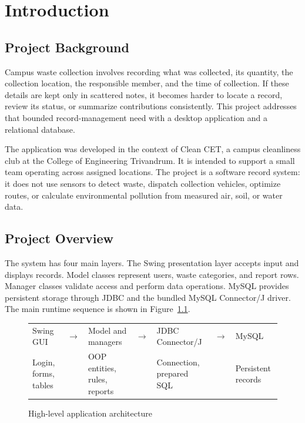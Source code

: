 \documentclass[12pt,a4paper]{report}
\begin{document}
\newpage
\tableofcontents
\listoffigures
\newpage
{}
\setcounter{page}{1}

\chapter{Introduction}
\section{Project Background}
Campus waste collection involves recording what was collected, its quantity, the collection location, the responsible member, and the time of collection. If these details are kept only in scattered notes, it becomes harder to locate a record, review its status, or summarize contributions consistently. This project addresses that bounded record-management need with a desktop application and a relational database.

The application was developed in the context of Clean CET, a campus cleanliness club at the College of Engineering Trivandrum. It is intended to support a small team operating across assigned locations. The project is a software record system: it does not use sensors to detect waste, dispatch collection vehicles, optimize routes, or calculate environmental pollution from measured air, soil, or water data.

\section{Project Overview}
The system has four main layers. The Swing presentation layer accepts input and displays records. Model classes represent users, waste categories, and report rows. Manager classes validate access and perform data operations. MySQL provides persistent storage through JDBC and the bundled MySQL Connector/J driver. The main runtime sequence is shown in Figure~\ref{fig:architecture}.

\begin{figure}[H]
\centering
\begin{tabular}{>{\centering\arraybackslash}p{}c>{\centering\arraybackslash}p{}c>{\centering\arraybackslash}p{}c>{\centering\arraybackslash}p{}}
Swing GUI & $\longrightarrow$ & Model and managers & $\longrightarrow$ & JDBC Connector/J & $\longrightarrow$ & MySQL\\
\small Login, forms, tables & & \small OOP entities, rules, reports & & \small Connection, prepared SQL & & \small Persistent records
\end{tabular}
\caption{High-level application architecture}
\label{fig:architecture}
\end{figure}
\end{document}
